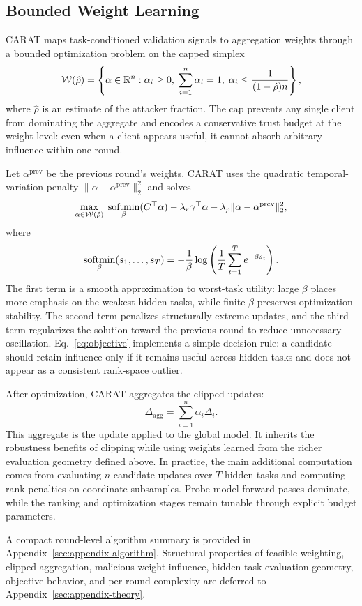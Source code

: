 \subsection{Bounded Weight Learning}

CARAT maps task-conditioned validation signals to aggregation weights through a bounded optimization problem on the capped simplex
\begin{equation}
\mathcal{W}(\hat{\rho}) =
\left\{
\alpha \in \mathbb{R}^n :
\alpha_i \ge 0,\;
\sum_{i=1}^n \alpha_i = 1,\;
\alpha_i \le \frac{1}{(1-\hat{\rho})n}
\right\},
\label{eq:capped-simplex}
\end{equation}
where $\hat{\rho}$ is an estimate of the attacker fraction. The cap prevents any single client from dominating the aggregate and encodes a conservative trust budget at the weight level: even when a client appears useful, it cannot absorb arbitrary influence within one round.

Let $\alpha^{\mathrm{prev}}$ be the previous round's weights. CARAT uses the quadratic temporal-variation penalty $\|\alpha-\alpha^{\mathrm{prev}}\|_2^2$ and solves
\begin{equation}
\max_{\alpha \in \mathcal{W}(\hat{\rho})}
\;\operatorname*{softmin}_{\beta}(C^\top \alpha)
- \lambda_r \gamma^\top \alpha
- \lambda_p \|\alpha - \alpha^{\mathrm{prev}}\|_2^2,
\label{eq:objective}
\end{equation}
where
\begin{equation}
\operatorname*{softmin}_{\beta}(s_1,\dots,s_T)
= -\frac{1}{\beta}\log\left(\frac{1}{T}\sum_{t=1}^T e^{-\beta s_t}\right).
\label{eq:softmin}
\end{equation}
The first term is a smooth approximation to worst-task utility: large $\beta$ places more emphasis on the weakest hidden tasks, while finite $\beta$ preserves optimization stability. The second term penalizes structurally extreme updates, and the third term regularizes the solution toward the previous round to reduce unnecessary oscillation. Eq.~\eqref{eq:objective} implements a simple decision rule: a candidate should retain influence only if it remains useful across hidden tasks and does not appear as a consistent rank-space outlier.

After optimization, CARAT aggregates the clipped updates:
\begin{equation}
\Delta_{\mathrm{agg}} = \sum_{i=1}^n \alpha_i \bar{\Delta}_i.
\label{eq:aggregate}
\end{equation}
This aggregate is the update applied to the global model. It inherits the robustness benefits of clipping while using weights learned from the richer evaluation geometry defined above. In practice, the main additional computation comes from evaluating $n$ candidate updates over $T$ hidden tasks and computing rank penalties on coordinate subsamples. Probe-model forward passes dominate, while the ranking and optimization stages remain tunable through explicit budget parameters.

A compact round-level algorithm summary is provided in Appendix~\ref{sec:appendix-algorithm}. Structural properties of feasible weighting, clipped aggregation, malicious-weight influence, hidden-task evaluation geometry, objective behavior, and per-round complexity are deferred to Appendix~\ref{sec:appendix-theory}.
